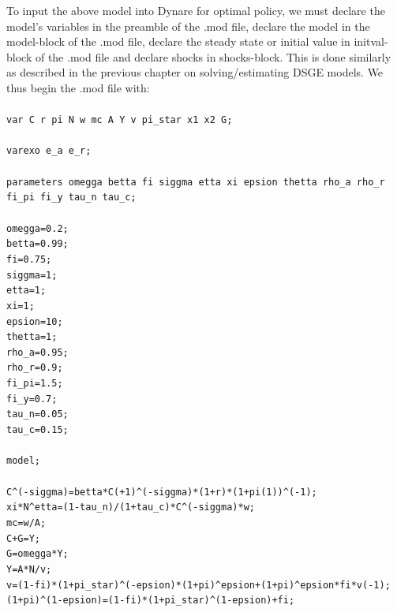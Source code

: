 \documentclass[cn,10pt,math=newtx,citestyle=gb7714-2015,bibstyle=gb7714-2015]{elegantbook}
\begin{document}
	To input the above model into Dynare for optimal policy, we must declare the model’s variables in the preamble of the .mod file, declare the model in the model-block of the .mod file, declare the steady state or initial value in initval-block of the .mod file and declare shocks in shocks-block. This is done similarly as described in the previous chapter on solving/estimating DSGE models. We thus begin the .mod file with:\\
	\\
	\texttt{var C r pi N w mc A Y v pi\_star x1 x2 G;\\
		\\
		varexo e\_a e\_r;\\
		\\
		parameters omegga betta fi siggma etta xi epsion thetta rho\_a rho\_r fi\_pi fi\_y tau\_n tau\_c;\\
		\\
		omegga=0.2;\\
		betta=0.99;\\
		fi=0.75;\\
		siggma=1;\\
		etta=1;\\
		xi=1;\\
		epsion=10;\\
		thetta=1;\\
		rho\_a=0.95;\\
		rho\_r=0.9;\\
		fi\_pi=1.5;\\
		fi\_y=0.7;\\
		tau\_n=0.05;\\
		tau\_c=0.15;\\
		\\
		model;\\
		\\
		C\textasciicircum (-siggma)=betta*C(+1)\textasciicircum(-siggma)*(1+r)*(1+pi(1))\textasciicircum(-1);\\
		xi*N\textasciicircum etta=(1-tau\_n)/(1+tau\_c)*C\textasciicircum (-siggma)*w;\\
		mc=w/A;\\
		C+G=Y;\\
		G=omegga*Y;\\
		Y=A*N/v;\\
		v=(1-fi)*(1+pi\_star)\textasciicircum (-epsion)*(1+pi)\textasciicircum epsion+(1+pi)\textasciicircum epsion*fi*v(-1);\\
		(1+pi)\textasciicircum (1-epsion)=(1-fi)*(1+pi\_star)\textasciicircum (1-epsion)+fi;\\
}
\end{document}
